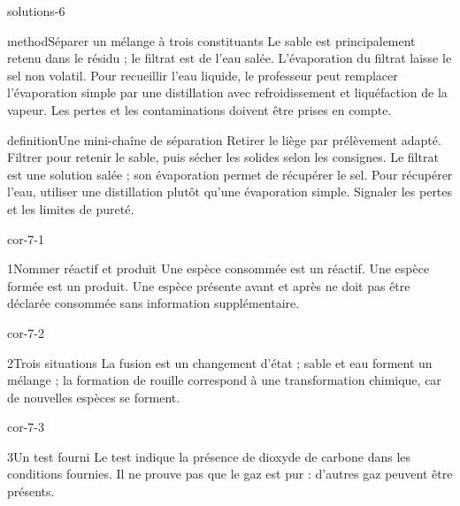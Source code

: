 \documentclass[12pt,twoside,openany]{book}
\begin{document}
\begin{pcFiche}{solutions-6}
\begin{pcEncadre}{method}{Séparer un mélange à trois constituants}
Le sable est principalement retenu dans le résidu ; le filtrat est de l’eau salée. L’évaporation du filtrat laisse le sel non volatil. Pour recueillir l’eau liquide, le professeur peut remplacer l’évaporation simple par une distillation avec refroidissement et liquéfaction de la vapeur. Les pertes et les contaminations doivent être prises en compte.\par
\end{pcEncadre}
\label{defi-cor-6}
\begin{pcEncadre}{definition}{Une mini-chaîne de séparation}
Retirer le liège par prélèvement adapté. Filtrer pour retenir le sable, puis sécher les solides selon les consignes. Le filtrat est une solution salée ; son évaporation permet de récupérer le sel. Pour récupérer l’eau, utiliser une distillation plutôt qu’une évaporation simple. Signaler les pertes et les limites de pureté.\par
\end{pcEncadre}
\end{pcFiche}
\clearpage{}
\begin{blocLivre}{cor-7-1}
\begin{corrige}{1}{Nommer réactif et produit}
Une espèce consommée est un réactif. Une espèce formée est un produit. Une espèce présente avant et après ne doit pas être déclarée consommée sans information supplémentaire.\par
\end{corrige}\end{blocLivre}
\begin{blocLivre}{cor-7-2}
\begin{corrige}{2}{Trois situations}
La fusion est un changement d’état ; sable et eau forment un mélange ; la formation de rouille correspond à une transformation chimique, car de nouvelles espèces se forment.\par
\end{corrige}\end{blocLivre}
\begin{blocLivre}{cor-7-3}
\begin{corrige}{3}{Un test fourni}
Le test indique la présence de dioxyde de carbone dans les conditions fournies. Il ne prouve pas que le gaz est pur : d’autres gaz peuvent être présents.\par
\end{corrige}\end{blocLivre}
\end{document}
